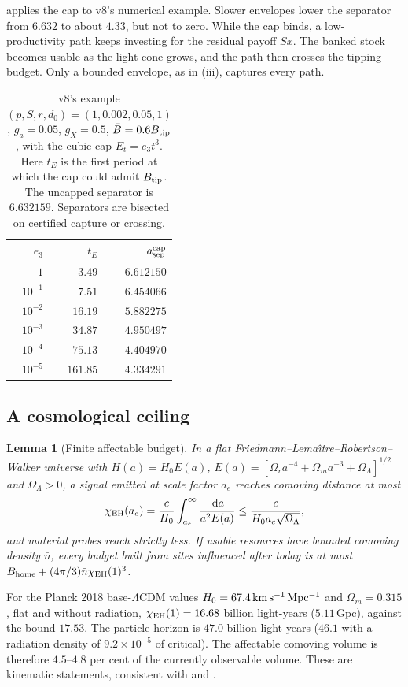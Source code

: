 \documentclass[11pt,a4paper]{article}
\newtheorem{lemma}[proposition]{Lemma}
\theoremstyle{definition}
\newcommand{\dd}{\,\mathrm{d}}
\newcommand{\Btip}{B_{\rm tip}}
\begin{document}
 applies the cap to v8's numerical example. Slower envelopes
lower the separator from $6.632$ to about $4.33$, but not to zero. While the
cap binds, a low-productivity path keeps investing for the residual payoff $Sx$.
The banked stock becomes usable as the light cone grows, and the path then
crosses the tipping budget. Only a bounded envelope, as in (iii), captures
every path.

\begin{table}[tbp]
\centering\small
\caption{v8's example $(p,S,r,d_0)=(1,0.002,0.05,1)$, $g_a=0.05$, $g_X=0.5$,
$\bar B=0.6\Btip$, with the cubic cap $E_t=e_3t^3$. Here $t_E$ is the first
period at which the cap could admit $\Btip$. The uncapped separator is
$6.632159$. Separators are bisected on certified capture or crossing.}
\label{tab:capped}
\begin{tabular}{@{}rrr@{}}\toprule
$e_3$ & $t_E$ & $a_{\rm sep}^{\rm cap}$\\\midrule
$1$ & $3.49$ & $6.612150$\\
$10^{-1}$ & $7.51$ & $6.454066$\\
$10^{-2}$ & $16.19$ & $5.882275$\\
$10^{-3}$ & $34.87$ & $4.950497$\\
$10^{-4}$ & $75.13$ & $4.404970$\\
$10^{-5}$ & $161.85$ & $4.334291$\\\bottomrule
\end{tabular}
\end{table}

\subsection{A cosmological ceiling}
\label{sec:cosmic}
\begin{lemma}[Finite affectable budget]
\label{lem:cosmic}
In a flat Friedmann--Lema\^{\i}tre--Robertson--Walker universe with
$H(a)=H_0E(a)$, $E(a)=[\Omega_ra^{-4}+\Omega_ma^{-3}+\Omega_\Lambda]^{1/2}$ and
$\Omega_\Lambda>0$, a signal emitted at scale factor $a_e$ reaches comoving distance at most
\begin{equation}
 \chi_{\rm EH}(a_e)=\frac c{H_0}\int_{a_e}^\infty\frac{\dd a}{a^2E(a)}
 \leq\frac{c}{H_0a_e\sqrt{\Omega_\Lambda}},
 \label{eq:event-horizon}
\end{equation}
and material probes reach strictly less. If usable resources have bounded
comoving density $\bar n$, every budget built from sites influenced after
today is at most $B_{\rm home}+(4\pi/3)\bar n\chi_{\rm EH}(1)^3$.
\end{lemma}
\noindent For the Planck 2018 base-$\Lambda$CDM values $H_0=67.4\,{\rm
km\,s^{-1}\,Mpc^{-1}}$ and $\Omega_m=0.315$ \citep{Planck2020}, flat and without
radiation, $\chi_{\rm EH}(1)=16.68$ billion light-years ($5.11\,$Gpc), against
the bound $17.53$. The particle horizon is $47.0$ billion light-years ($46.1$
with a radiation density of $9.2\times10^{-5}$ of critical). The affectable
comoving volume is therefore $4.5$--$4.8$ per cent of the currently observable
volume. These are kinematic statements, consistent with
\citet{KraussStarkman2000} and \citet{Ord2021}.
\end{document}
